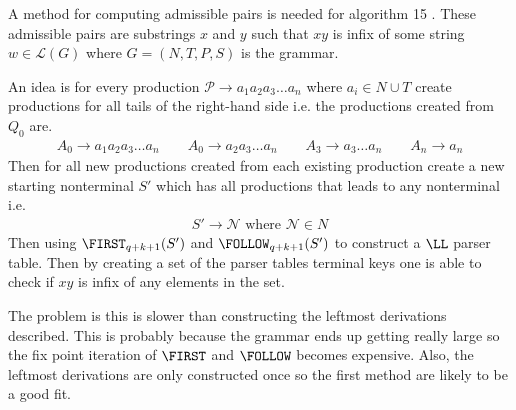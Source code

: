 A method for computing admissible pairs is needed for algorithm 15 \cite[15]{Vagner2007}. These admissible pairs are substrings $x$ and $y$ such that $xy$ is infix of some string $w \in \mathcal{L}(G)$ where $G = (N, T, P, S)$ is the grammar. 

An idea is for every production $\mathcal{P} \to a_{1}a_{2}a_{3} \dots a_{n}$ where $a_i \in N \cup T$ create productions for all tails of the right-hand side i.e. the productions created from $Q_0$ are.
\begin{gather*}
    A_{0} \to a_{1}a_{2}a_{3} \dots a_{n} \qquad A_{0} \to a_{2}a_{3} \dots a_{n} \qquad A_{3} \to a_{3} \dots a_{n} \qquad A_{n} \to  a_{n}
\end{gather*}
Then for all new productions created from each existing production create a new starting nonterminal $S'$ which has all productions that leads to any nonterminal i.e.
\begin{align*}
    S' \to  \mathcal{N} \text{ where } \mathcal{N} \in N
\end{align*}
Then using $\FIRST_{q + k + 1}(S')$ and $\FOLLOW_{q + k + 1}(S')$ to construct a $\LL$ parser table. Then by creating a set of the parser tables terminal keys one is able to check if $xy$ is infix of any elements in the set.

The problem is this is slower than constructing the leftmost derivations described. This is probably because the grammar ends up getting really large so the fix point iteration of $\FIRST$ and $\FOLLOW$ becomes expensive. Also, the leftmost derivations are only constructed once so the first method are likely to be a good fit.